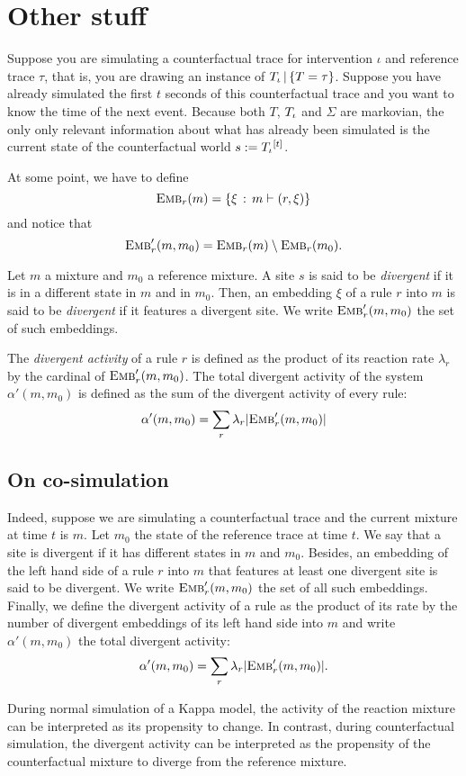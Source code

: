 \section*{Other stuff}

Suppose you are simulating a counterfactual trace for intervention
$\iota$ and reference trace $\tau$, that is, you are drawing an
instance of ${T_\iota\,|\,\{T=\tau\}}{}$. Suppose you have already simulated the first
$t$ seconds of this counterfactual trace and you want to know the time
of the next event. Because both $T$, ${T_\iota}{}$ and $\Sigma$ are
markovian, the only only relevant information about what has already
been simulated is the current state of the counterfactual world
$s := {T_\iota}{}^{[t]}$.

At some point, we have to define
\[{\textsc{Emb}}_{r}(m) = \{ \xi \,:\, m \vdash (r, \xi) \}\]
and notice that
\[{\textsc{Emb}}'_{r}(m, m_0) = {\textsc{Emb}}_{r}(m) \setminus {\textsc{Emb}}_{r}(m_0).\]


\begin{definition}
  Let $m$ a mixture and $m_0$ a reference mixture. A site $s$ is said
  to be \emph{divergent} if it is in a different state in $m$ and in
  $m_0$.  Then, an embedding $\xi$ of a rule $r$ into $m$ is said to
  be \emph{divergent} if it features a divergent site. We write
  ${\textsc{Emb}}'_{r}(m, m_0)$ the set of such embeddings.
\end{definition}

\begin{definition}
  The \emph{divergent activity} of a rule $r$ is defined as the
  product of its reaction rate $\lambda_r$ by the cardinal of
  ${\textsc{Emb}}'_{r}(m, m_0)$.  The total divergent activity of the system
  $\alpha'(m, m_0)$ is defined as the sum of the divergent activity of
  every rule:
  \[\alpha'(m, m_0) = \sum_r \lambda_r |{\textsc{Emb}}'_{r}(m, m_0)| \]
\end{definition}

\subsection*{On co-simulation}

Indeed, suppose we are simulating a counterfactual trace and the
current mixture at time $t$ is $m$. Let $m_0$ the state of the
reference trace at time $t$. We say that a site is divergent if it has
different states in $m$ and $m_0$.  Besides, an embedding of the left
hand side of a rule $r$ into $m$ that features at least one divergent
site is said to be divergent. We write ${\textsc{Emb}}'_{r}(m, m_0)$ the set of
all such embeddings.  Finally, we define the divergent activity of a
rule as the product of its rate by the number of divergent embeddings
of its left hand side into $m$ and write $\alpha'(m, m_0)$ the total
divergent activity:
\[\alpha'(m, m_0) = \sum_r \lambda_r |{\textsc{Emb}}'_{r}(m, m_0)|. \]


During normal simulation of a Kappa model, the activity of the
reaction mixture can be interpreted as its propensity to change. In
contrast, during counterfactual simulation, the divergent activity can
be interpreted as the propensity of the counterfactual mixture to
diverge from the reference mixture.